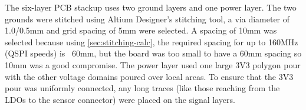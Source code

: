 The six-layer PCB stackup uses two ground layers and one power layer. The two grounds were stitched using Altium Designer's stitching tool, a via diameter of 1.0/0.5mm and grid spacing of 5mm were selected. A spacing of 10mm was selected because using \autoref{sec:stitching-calc}, the required spacing for up to 160MHz (QSPI speeds) is ~60mm, but the board was too small to have a 60mm spacing so 10mm was a good compromise.
\nl
The power layer used one large 3V3 polygon pour with the other voltage domains poured over local areas. To ensure that the 3V3 pour was uniformly connected, any long traces (like those reaching from the LDOs to the sensor connector) were placed on the signal layers.